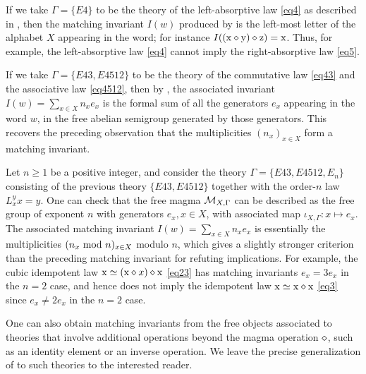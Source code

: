 \begin{example}  If we take $\Gamma = \{E4\}$ to be the theory of the left-absorptive law \eqref{eq4} as described in , then the matching invariant $I(w)$ produced by  is the left-most letter of the alphabet $X$ appearing in the word; for instance $I((\mathrm{x} \diamond \mathrm{y}) \diamond \mathrm{z}) = \mathrm{x}$.  Thus, for example, the left-absorptive law \eqref{eq4} cannot imply the right-absorptive law \eqref{eq5}.
\end{example}

\begin{example}  If we take $\Gamma = \{E43, E4512\}$ to be the theory of the commutative law \eqref{eq43} and the associative law \eqref{eq4512}, then by , the associated invariant $I(w) = \sum_{x \in X} n_x e_x$ is the formal sum of all the generators $e_x$ appearing in the word $w$, in the free abelian semigroup generated by those generators.  This recovers the preceding observation that the multiplicities $(n_x)_{x \in X}$ form a matching invariant.
\end{example}

\begin{example}  Let $n \geq 1$ be a positive integer, and consider the theory $\Gamma = \{E43, E4512, E_n\}$ consisting of the previous theory $\{E43, E4512\}$ together with the order-$n$ law $L_x^y x = y$.  One can check that the free magma ${\mathcal{M}}_{X,\Gamma}$ can be described as the free group of exponent $n$ with generators $e_x, x \in X$, with associated map $\iota_{X,\Gamma} \colon x \mapsto e_x$.  The associated matching invariant $I(w) = \sum_{x \in X} n_x e_x$ is essentially the multiplicities $(n_x \hbox{ mod } n)_{x \in X}$ modulo $n$, which gives a slightly stronger criterion than the preceding matching invariant for refuting implications.  For example, the cubic idempotent law $\mathrm{x} \simeq (\mathrm{x} \diamond x) \diamond \mathrm{x}$ \eqref{eq23}
has matching invariants $e_x = 3e_x$ in the $n=2$ case, and hence does not imply the idempotent law $\mathrm{x} \simeq \mathrm{x} \diamond \mathrm{x}$ \eqref{eq3} since $e_x \neq 2e_x$ in the $n=2$ case.
\end{example}


\begin{remark}  One can also obtain matching invariants from the free objects associated to theories that involve additional operations beyond the magma operation $\diamond$, such as an identity element or an inverse operation.  We leave the precise generalization of  to such theories to the interested reader.
\end{remark}

